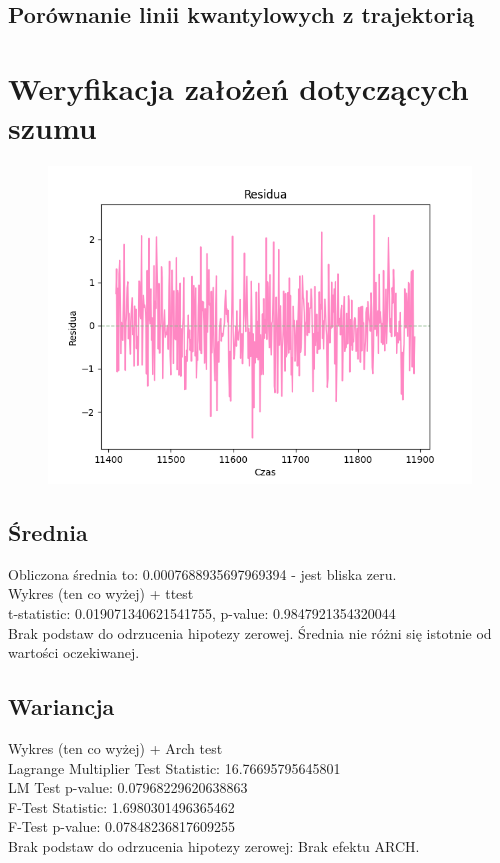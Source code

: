 \documentclass[12pt]{article}
\begin{document}
\subsection{Porównanie linii kwantylowych z trajektorią}


\section{Weryfikacja założeń dotyczących szumu}
\begin{figure}[!htbp]
    \centering
    \includegraphics[scale=0.70]{residuals.png}
    \label{fig:enter-label}
\end{figure}
\subsection{Średnia}
Obliczona średnia to: 0.0007688935697969394 - jest bliska zeru. \\
Wykres (ten co wyżej) + ttest \\
t-statistic: 0.019071340621541755, p-value: 0.9847921354320044 \\
Brak podstaw do odrzucenia hipotezy zerowej. Średnia nie różni się istotnie od wartości oczekiwanej.

\subsection{Wariancja}
Wykres (ten co wyżej)  + Arch test \\
Lagrange Multiplier Test Statistic: 16.76695795645801 \\
LM Test p-value: 0.07968229620638863 \\
F-Test Statistic: 1.6980301496365462 \\
F-Test p-value: 0.07848236817609255 \\
Brak podstaw do odrzucenia hipotezy zerowej: Brak efektu ARCH.
\end{document}
